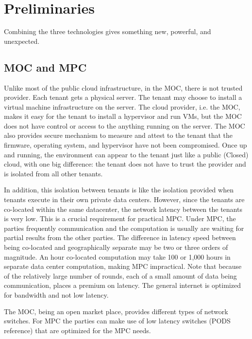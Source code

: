 \section{Preliminaries}

Combining the three technologies gives something new, powerful, and unexpected.



\subsection{MOC and MPC}

Unlike most of the public cloud infrastructure, in the MOC, there is not trusted provider.   Each tenant gets a physical server.  The tenant may choose to install a virtual machine infrastructure on the server.    The cloud provider, i.e. the MOC, makes it easy for the tenant to install a hypervisor and run VMs, but the MOC does not have control or access to the anything running on the server.   The MOC also provides secure mechanism to measure and attest to the tenant that the firmware, operating system, and hypervisor have not been compromised.   Once up and running, the environment can appear to the tenant just like a public (Closed) cloud, with one big difference:  the tenant does not have to trust the provider and is isolated from all other tenants.

In addition, this isolation between tenants is like the isolation provided when tenants execute in their own private data centers.  However, since the tenants are co-located within the same datacenter, the network latency between the tenants is very low.  This is a crucial requirement for practical MPC.   Under MPC, the parties frequently communication and the computation is usually are waiting for partial results from the other parties.   The difference in latency speed between  being co-located and geographically separate may be two or three orders of magnitude.   An hour co-located computation may take 100 or 1,000 hours in separate data center computation, making MPC impractical.    Note that because of the relatively large number of rounds, each of a small amount of data being communication, places a premium on latency.  The general internet is optimized for bandwidth and not low latency.

The MOC, being an open market place, provides different types of network switches.   For MPC the parties can make use of low latency switches (PODS reference) that are optimized for the MPC needs.


